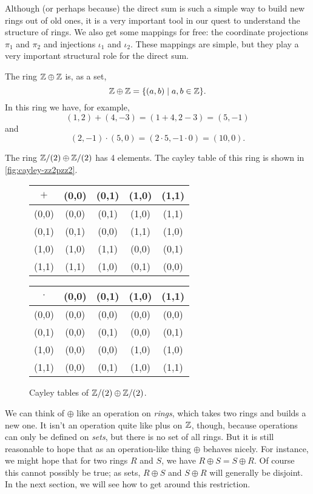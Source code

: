 Although (or perhaps because) the direct sum is such a simple way to build new rings out of old ones, it is a very important tool in our quest to understand the structure of rings.
We also get some mappings for free: the coordinate projections \(\pi_1\) and \(\pi_2\) and injections \(\iota_1\) and \(\iota_2\).
These mappings are simple, but they play a very important structural role for the direct sum.

\begin{examples}
\item The ring \(\mathbb{Z} \oplus \mathbb{Z}\) is, as a set, \[ \mathbb{Z} \oplus \mathbb{Z} = \{ (a,b) \mid a,b \in \mathbb{Z} \}. \]
In this ring we have, for example, \[ (1,2) + (4,-3) = (1+4, 2-3) = (5,-1) \] and \[ (2,-1) \cdot (5,0) = (2 \cdot 5, -1 \cdot 0) = (10,0). \]
\item The ring \(\mathbb{Z}/(2) \oplus \mathbb{Z}/(2)\) has 4 elements.
The cayley table of this ring is shown in \autoref{fig:cayley-zz2pzz2}.
\begin{figure}[h!]
\begin{center}
\small
\addtolength{\tabcolsep}{-2pt}
\begin{tabular}{c|cccc}
\(+\) & (0,0) & (0,1) & (1,0) & (1,1) \\ \hline
(0,0) & (0,0) & (0,1) & (1,0) & (1,1) \\
(0,1) & (0,1) & (0,0) & (1,1) & (1,0) \\
(1,0) & (1,0) & (1,1) & (0,0) & (0,1) \\
(1,1) & (1,1) & (1,0) & (0,1) & (0,0)
\end{tabular}
\quad
\begin{tabular}{c|cccc}\setlength{\tabcolsep}{5pt}
\(\cdot\)
      & (0,0) & (0,1) & (1,0) & (1,1) \\ \hline
(0,0) & (0,0) & (0,0) & (0,0) & (0,0) \\
(0,1) & (0,0) & (0,1) & (0,0) & (0,1) \\
(1,0) & (0,0) & (0,0) & (1,0) & (1,0) \\
(1,1) & (0,0) & (0,1) & (1,0) & (1,1)
\end{tabular}
\addtolength{\tabcolsep}{2pt}
\end{center}
\caption{\label{fig:cayley-zz2pzz2} Cayley tables of \(\mathbb{Z}/(2) \oplus \mathbb{Z}/(2)\).}
\end{figure}
\end{examples}

We can think of \(\oplus\) like an operation on \emph{rings}, which takes two rings and builds a new one.
It isn't an operation quite like plus on \(\mathbb{Z}\), though, because operations can only be defined on \emph{sets}, but there is no set of all rings.
But it is still reasonable to hope that as an operation-like thing \(\oplus\) behaves nicely.
For instance, we might hope that for two rings \(R\) and \(S\), we have \(R \oplus S = S \oplus R\).
Of course this cannot possibly be true; as sets, \(R \oplus S\) and \(S \oplus R\) will generally be disjoint.
In the next section, we will see how to get around this restriction.

